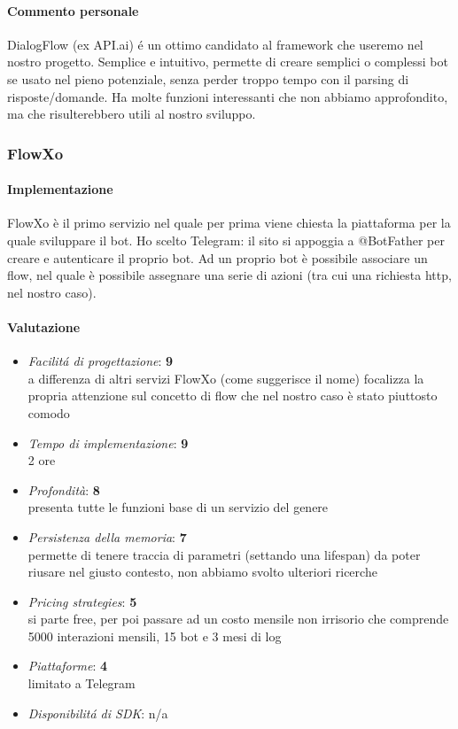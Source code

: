 \documentclass[]{article}
\begin{document}
\paragraph{Commento personale}
DialogFlow (ex API.ai) é un ottimo candidato al framework che useremo nel nostro progetto. Semplice e intuitivo, permette di creare semplici o complessi bot se usato nel pieno potenziale, senza perder troppo tempo con il parsing di risposte/domande. Ha molte funzioni interessanti che non abbiamo approfondito, ma che risulterebbero utili al nostro sviluppo. 

\subsubsection{FlowXo}
\paragraph{Implementazione}
FlowXo è il primo servizio nel quale per prima viene chiesta la piattaforma per la quale sviluppare il bot. Ho scelto Telegram: il sito si appoggia a @BotFather per creare e autenticare il proprio bot. Ad un proprio bot è possibile associare un flow, nel quale è possibile assegnare una serie di azioni (tra cui una richiesta http, nel nostro caso).
\paragraph{Valutazione}
\begin{itemize}
\item \textit{Facilitá di progettazione}: \textbf{9} \\ a differenza di altri servizi FlowXo (come suggerisce il nome) focalizza la propria attenzione sul concetto di flow che nel nostro caso è stato piuttosto comodo
\item \textit{Tempo di implementazione}: \textbf{9} \\ 2 ore
\item \textit{Profondità}: \textbf{8} \\ presenta tutte le funzioni base di un servizio del genere
\item \textit{Persistenza della memoria}: \textbf{7} \\ permette di tenere traccia di parametri (settando una lifespan) da poter riusare nel giusto contesto, non abbiamo svolto ulteriori ricerche
\item \textit{Pricing strategies}: \textbf{5} \\ si parte free, per poi passare ad un costo mensile non irrisorio che comprende 5000 interazioni mensili, 15 bot e 3 mesi di log
\item \textit{Piattaforme}: \textbf{4} \\ limitato a Telegram
\item \textit{Disponibilitá di SDK}: n/a
\end{itemize}
\end{document}
